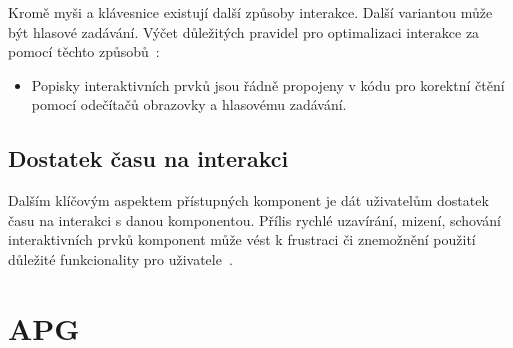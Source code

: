 Kromě myši a klávesnice existují další způsoby interakce.
Další variantou může být hlasové zadávání.
Výčet důležitých pravidel pro optimalizaci interakce za pomocí těchto způsobů~\cite{w3-accessibility-principles}:

\begin{itemize}
    \item Popisky interaktivních prvků jsou řádně propojeny v kódu pro korektní čtění pomocí odečítačů obrazovky a hlasovému zadávání.
\end{itemize}

\subsection{Dostatek času na interakci}

Dalším klíčovým aspektem přístupných komponent je dát uživatelům dostatek času na interakci s danou komponentou.
Přílis rychlé uzavírání, mizení, schování interaktivních prvků komponent může vést k frustraci či znemožnění použití důležité funkcionality pro uživatele~\cite{w3-accessibility-principles}.

\section{APG}

